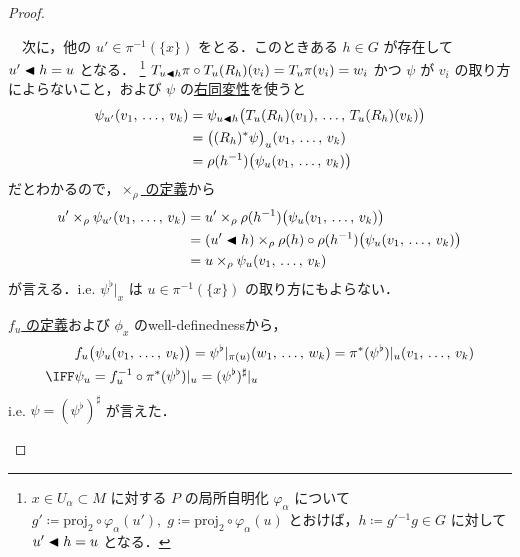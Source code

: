 \documentclass[geometry_main]{subfiles}
\begin{document}
\begin{proof}
\begin{enumerate}
\begin{description}
\begin{description}
                　次に，他の $u' \in \pi^{-1}(\{x\})$ をとる．このときある $h \in G$ が存在して $u' \blacktriangleleft h = u$ となる．
                \footnote{
                    $x \in U_\alpha \subset M$ に対する $P$ の局所自明化 $\varphi_\alpha$ について $g' \coloneqq \mathrm{proj}_2 \circ \varphi_\alpha (u'),\; g \coloneqq \mathrm{proj}_2 \circ \varphi_\alpha (u)$ とおけば，$h \coloneqq g'{}^{-1}g \in G$ に対して $u' \blacktriangleleft h = u$ となる．
                }
                $T_{u \blacktriangleleft h} \pi \circ T_{u} (R_{h})(v_i) = T_{u} \pi (v_i) = w_i$ かつ $\psi$ が $v_i$ の取り方によらないこと，および $\psi$ の\hyperref[def:tensorial-form]{右同変性}を使うと
                \begin{align}
                    \psi_{u'} (v_1,\, \dots,\, v_k)
                    &= \psi_{u \blacktriangleleft h} \bigl(T_{u}(R_h)(v_1),\, \dots,\, T_{u}(R_h)(v_k)\bigr) \\
                    &= \bigl((R_h)^* \psi\bigr)_u (v_1,\, \dots,\, v_k) \\
                    &= \rho(h^{-1})\bigl(\psi_u (v_1,\, \dots,\, v_k)\bigr)
                \end{align}
                だとわかるので，\hyperref[prop:Borelconst]{$\times_\rho$ の定義}から
                \begin{align}
                    u' \times_\rho \psi_{u'} (v_1,\, \dots,\, v_k)
                    &= u ' \times_\rho \rho(h^{-1})\bigl(\psi_u (v_1,\, \dots,\, v_k)\bigr) \\
                    &= (u ' \blacktriangleleft h) \times_\rho \rho(h) \circ \rho(h^{-1})\bigl(\psi_u (v_1,\, \dots,\, v_k)\bigr) \\
                    &= u \times_\rho \psi_u (v_1,\, \dots,\, v_k)
                \end{align}
                が言える．i.e. $\psi^\flat|_x$ は $u \in \pi^{-1}(\{x\})$ の取り方にもよらない．
            \end{description}
            \hyperref[lem:assoc-basic]{$f_u$ の定義}および $\phi_x$ のwell-definednessから，
            \begin{align}
                &f_u \bigl(\psi_u(v_1,\, \dots,\, v_k)\bigr) = \psi^\flat|_{\pi(u)}(w_1,\, \dots,\, w_k) = \pi^* (\psi^\flat)|_u (v_1,\, \dots,\, v_k) \\
                \IFF &\psi_u = f_u^{-1} \circ \pi^* (\psi^\flat)|_u = (\psi^\flat)^\sharp|_u
            \end{align}
            i.e. $\psi = (\psi^\flat)^\sharp$ が言えた．
        \end{description}

\end{enumerate}
\end{proof}
\end{document}
